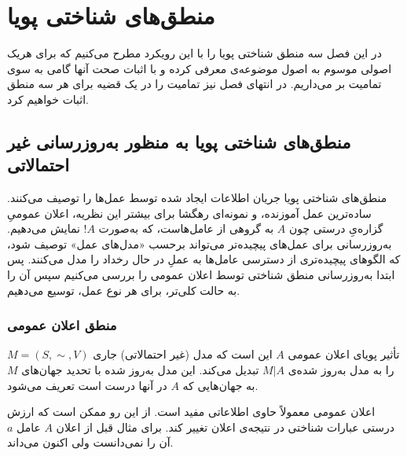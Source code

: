 \chapter{منطق‌های شناختی پویا}
در این فصل سه منطق شناختی پویا را با این رویکرد مطرح می‌کنیم که برای هریک اصولی موسوم به اصول موضوعه‌ی {\reduction{}} معرفی کرده و با اثبات صحت آنها گامی به سوی تمامیت بر می‌داریم. در انتهای فصل نیز تمامیت را در یک قضیه برای هر سه منطق اثبات خواهیم کرد.
\section{منطق‌های شناختی پویا به منظور به‌روزرسانی غیر احتمالاتی}
منطق‌های شناختی پویا جریان اطلاعات ایجاد شده توسط عمل‌ها را توصیف می‌کنند. ساده‌ترین عمل آموزنده، و نمونه‌ای رهگشا برای بیشتر این نظریه، اعلان عمومیِ گزاره‌یِ درستی چون $ A $ به گروهی از عامل‌هاست، که به‌صورت $ !A $  نمایش می‌دهیم. به‌روزرسانی برای عمل‌های پیچیده‌تر می‌تواند برحسب «مدل‌های عمل» توصیف شود، که الگوهای پیچیده‌تری از دسترسی عامل‌ها به عملِ در حال رخداد را مدل می‌کنند. پس ابتدا به‌روزرسانی منطق شناختی توسط اعلان عمومی را بررسی می‌کنیم سپس آن را به حالت کلی‌تر، برای هر نوع عمل، توسیع می‌دهیم.

\subsection{منطق اعلان عمومی \texorpdfstring{ }{(PAL)}}
تأثیر پویای اعلان عمومی $ A $ این است که مدل (غیر احتمالاتی) جاری  $ M=(S,\sim,V) $ را به مدل به‌روز شده‌ی $ M|A $ تبدیل می‌کند. این مدل به‌روز شده با تحدید جهان‌های $ M $ به جهان‌هایی که $ A $ در آنها درست است تعریف می‌شود.

اعلان عمومی معمولاً حاوی اطلاعاتی مفید است. از این رو ممکن است که ارزش درستی عبارات شناختی در نتیجه‌ی اعلان تغییر کند. برای مثال قبل از اعلان $ A $ عامل $ a $ آن را نمی‌دانست ولی اکنون می‌داند.

